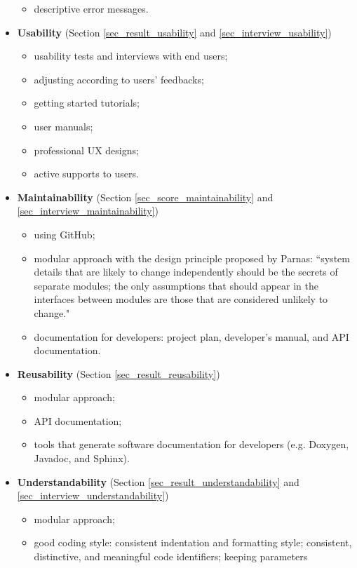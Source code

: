 \documentclass[3p, 12pt,authoryear]{elsarticle}
\begin{document}
\begin{itemize}
\begin{itemize}
    \item descriptive error messages.
\end{itemize}
\item \textbf{Usability} (Section \ref{sec_result_usability} and \ref{sec_interview_usability})
\begin{itemize}
    \item usability tests and interviews with end users;
    \item adjusting according to users’ feedbacks;
    \item getting started tutorials;
    \item user manuals;
    \item professional UX designs;
    \item active supports to users.
\end{itemize}
\item \textbf{Maintainability} (Section \ref{sec_score_maintainability} and
\ref{sec_interview_maintainability})
\begin{itemize}
    \item using GitHub;
    \item modular approach with the design principle proposed by Parnas:
    ``system details that are likely to change independently should be the
    secrets of separate modules; the only assumptions that should appear in the
    interfaces between modules are those that are considered unlikely to
    change." \citep{ParnasEtAl2000}
    \item documentation for developers: project plan, developer’s manual, and API documentation.
\end{itemize}
\item \textbf{Reusability} (Section \ref{sec_result_reusability})
\begin{itemize}
    \item modular approach;
    \item API documentation;
    \item tools that generate software documentation for developers (e.g.
    Doxygen, Javadoc, and Sphinx).
\end{itemize}
\item \textbf{Understandability} (Section \ref{sec_result_understandability} and
\ref{sec_interview_understandability})
\begin{itemize}
    \item modular approach;
    \item good coding style: consistent indentation and formatting style;
    consistent, distinctive, and meaningful code identifiers; keeping parameters

\end{itemize}
\end{itemize}
\end{document}
